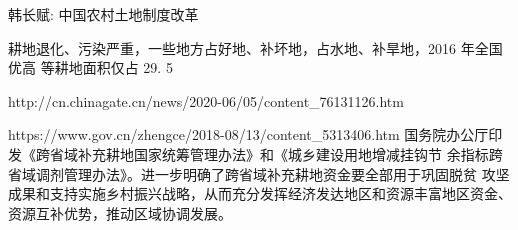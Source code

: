 
韩长赋: 中国农村土地制度改革

耕地退化、污染严重，一些地方占好地、补坏地，占水地、补旱地，2016 年全国优高
等耕地面积仅占 29. 5%


http://cn.chinagate.cn/news/2020-06/05/content_76131126.htm

https://www.gov.cn/zhengce/2018-08/13/content_5313406.htm
国务院办公厅印发《跨省域补充耕地国家统筹管理办法》和《城乡建设用地增减挂钩节
余指标跨省域调剂管理办法》。进一步明确了跨省域补充耕地资金要全部用于巩固脱贫
攻坚成果和支持实施乡村振兴战略，从而充分发挥经济发达地区和资源丰富地区资金、
资源互补优势，推动区域协调发展。

